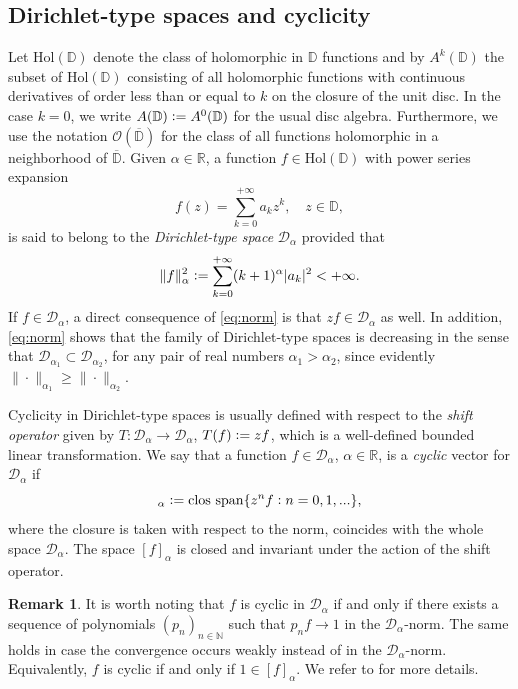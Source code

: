\documentclass[12pt]{amsart}
\theoremstyle{definition}\newtheorem{remark}[theorem]{Remark}
\theoremstyle{definition}\newtheorem{example}[theorem]{Example}
\theoremstyle{definition}\newtheorem{definition}{Definition}
\numberwithin{equation}{section}
\newcommand\Hol{{\mathrm{Hol}(\mathbb D)}}
\newcommand\cD{{\mathcal D}}
\newcommand\RR{{\mathbb R}}
\newcommand\DD{{\mathbb D}}
\begin{document}
\subsection{Dirichlet-type spaces and cyclicity}\label{subsec:dirichlet}
Let $\mathrm{Hol}(\DD)$ denote the class of holomorphic in $\DD$ functions and by $A^k(\DD)$ the subset of $\mathrm{Hol}(\DD)$ consisting of all holomorphic functions with continuous derivatives of order less than or equal to $k$ on the closure of the unit disc. In the case $k=0$, we write $A(\DD)\vcentcolon=A^0(\DD)$ for the usual disc algebra. Furthermore, we use the notation $\mathcal{O}(\overline{\DD})$ for the class of all functions holomorphic in a neighborhood of $\overline{\DD}$. Given $\alpha\in\RR$, a function $f\in \Hol$ with power series expansion
\begin{equation*}
f(z)=\sum_{k=0}^{+\infty}a_kz^k, \quad z\in \DD,
\end{equation*}
is said to belong to the \textit{Dirichlet-type space} $\cD_\alpha$ provided that 
\begin{equation}\label{eq:norm}
\|f\|^2_\alpha\vcentcolon=\sum_{k=0}^{+\infty}(k+1)^\alpha|a_k|^2<+\infty.
\end{equation}
If $f\in\cD_\alpha$, a direct consequence of \eqref{eq:norm} is that $zf\in\cD_\alpha$ as well. In addition, \eqref{eq:norm} shows that the family of Dirichlet-type spaces is decreasing in the sense that $\cD_{\alpha_1}\subset \cD_{\alpha_2}$, for any pair of real numbers $\alpha_1>\alpha_2$, since evidently $\|\cdot\|_{\alpha_1}\ge\|\cdot\|_{\alpha_2}$. 

Cyclicity in Dirichlet-type spaces is usually defined with respect to the \textit{shift operator} given by $T:\cD_\alpha\rightarrow \cD_\alpha$, $T(f)\vcentcolon=zf$, which is a well-defined bounded linear transformation. We say that a function $f\in\cD_\alpha$, $\alpha\in \RR$, is a \textit{cyclic} vector for $\mathcal{D}_\alpha$ if 
\begin{equation*}
[f]_\alpha\vcentcolon=\mathrm{clos}\text{ }\mathrm{span}\{z^nf\vcentcolon n=0,1,...\},
\end{equation*}
where the closure is taken with respect to the norm, coincides with the whole space $\cD_\alpha$. The space $[f]_\alpha$ is closed and invariant under the action of the shift operator.

\begin{remark}\label{equiv cyclic}
It is worth noting that $f$ is cyclic in $\cD_\alpha$ if and only if there exists a sequence of polynomials $(p_n)_{n\in \mathbb N}$ such that $p_nf\rightarrow 1$ in the $\cD_\alpha$-norm. The same holds in case the convergence occurs weakly instead of in the $\cD_\alpha$-norm. Equivalently, $f$ is cyclic if and only if $1\in [f]_\alpha$. We refer to \cite[Proposition 5]{Brown-Shields} for more details.
\end{remark}
\end{document}
